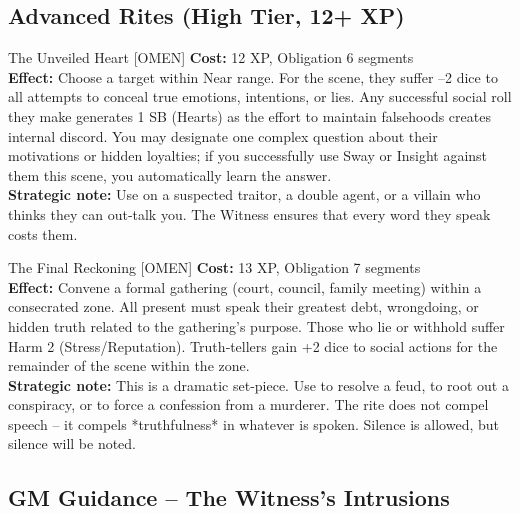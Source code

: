 \documentclass[10pt,a5paper]{book}
\begin{document}
\subsection*{Advanced Rites (High Tier, 12+ XP)}

\begin{patronbox}{The Unveiled Heart [OMEN]}
\textbf{Cost:} 12 XP, Obligation 6 segments \\
\textbf{Effect:} Choose a target within Near range. For the scene, they suffer –2 dice to all attempts to conceal true emotions, intentions, or lies. Any successful social roll they make generates 1 SB (Hearts) as the effort to maintain falsehoods creates internal discord. You may designate one complex question about their motivations or hidden loyalties; if you successfully use Sway or Insight against them this scene, you automatically learn the answer. \\
\textbf{Strategic note:} Use on a suspected traitor, a double agent, or a villain who thinks they can out‑talk you. The Witness ensures that every word they speak costs them.
\end{patronbox}

\begin{patronbox}{The Final Reckoning [OMEN]}
\textbf{Cost:} 13 XP, Obligation 7 segments \\
\textbf{Effect:} Convene a formal gathering (court, council, family meeting) within a consecrated zone. All present must speak their greatest debt, wrongdoing, or hidden truth related to the gathering’s purpose. Those who lie or withhold suffer Harm 2 (Stress/Reputation). Truth‑tellers gain +2 dice to social actions for the remainder of the scene within the zone. \\
\textbf{Strategic note:} This is a dramatic set‑piece. Use to resolve a feud, to root out a conspiracy, or to force a confession from a murderer. The rite does not compel speech – it compels *truthfulness* in whatever is spoken. Silence is allowed, but silence will be noted.
\end{patronbox}

\subsection*{GM Guidance – The Witness’s Intrusions}
\end{document}
